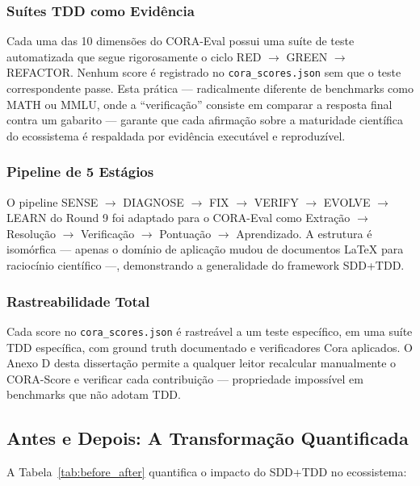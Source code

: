 \subsubsection{Suítes TDD como Evidência}

Cada uma das 10 dimensões do CORA-Eval possui uma suíte de teste automatizada
que segue rigorosamente o ciclo RED $\to$ GREEN $\to$ REFACTOR. Nenhum score
é registrado no \texttt{cora\_scores.json} sem que o teste correspondente
passe. Esta prática — radicalmente diferente de benchmarks como MATH ou MMLU,
onde a ``verificação'' consiste em comparar a resposta final contra um
gabarito — garante que cada afirmação sobre a maturidade científica do
ecossistema é respaldada por evidência executável e reproduzível.

\subsubsection{Pipeline de 5 Estágios}

O pipeline SENSE $\to$ DIAGNOSE $\to$ FIX $\to$ VERIFY $\to$ EVOLVE $\to$
LEARN do Round 9 foi adaptado para o CORA-Eval como Extração $\to$ Resolução
$\to$ Verificação $\to$ Pontuação $\to$ Aprendizado. A estrutura é
isomórfica — apenas o domínio de aplicação mudou de documentos LaTeX para
raciocínio científico —, demonstrando a generalidade do framework SDD+TDD.

\subsubsection{Rastreabilidade Total}

Cada score no \texttt{cora\_scores.json} é rastreável a um teste específico,
em uma suíte TDD específica, com ground truth documentado e verificadores
Cora aplicados. O Anexo D desta dissertação permite a qualquer leitor
recalcular manualmente o CORA-Score e verificar cada contribuição —
propriedade impossível em benchmarks que não adotam TDD.

\subsection{Antes e Depois: A Transformação Quantificada}

A Tabela~\ref{tab:before_after} quantifica o impacto do SDD+TDD no
ecossistema:

